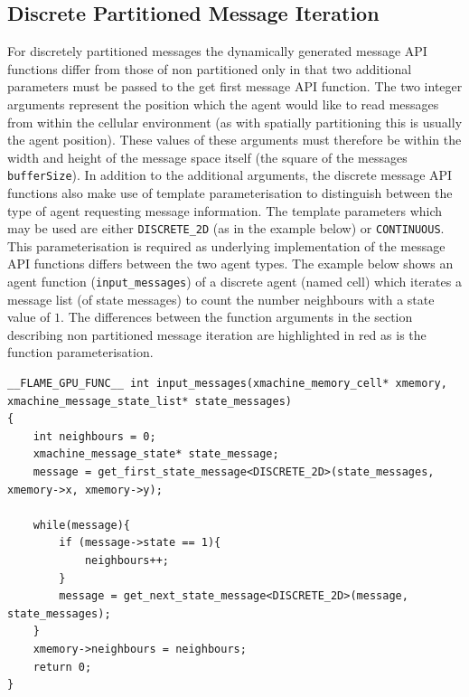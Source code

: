 \documentclass[11pt, a4paper, onecolumn, oneside]{report}
\begin{document}
\subsection{Discrete Partitioned Message Iteration}
\label{sec:353}


For discretely partitioned messages the dynamically generated message API functions differ from those of non partitioned only in that two additional parameters must be passed to the get first message API function.
The two integer arguments represent the position which the agent would like to read messages from within the cellular environment (as with spatially partitioning this is usually the agent position).
These values of these arguments must therefore be within the width and height of the message space itself (the square of the messages \texttt{bufferSize}).
In addition to the additional arguments, the discrete message API functions also make use of template parameterisation to distinguish between the type of agent requesting message information.
The template parameters which may be used are either \texttt{DISCRETE_2D} (as in the example below) or \texttt{CONTINUOUS}.
This parameterisation is required as underlying implementation of the message API functions differs between the two agent types.
The example below shows an agent function (\texttt{input_messages}) of a discrete agent (named cell) which iterates a message list (of state messages) to count the number neighbours with a state value of $1$.
The differences between the function arguments in the section describing non partitioned message iteration are highlighted in red as is the function parameterisation.

\begin{verbatim}
__FLAME_GPU_FUNC__ int input_messages(xmachine_memory_cell* xmemory, xmachine_message_state_list* state_messages)
{
    int neighbours = 0;
    xmachine_message_state* state_message;
    message = get_first_state_message<DISCRETE_2D>(state_messages, xmemory->x, xmemory->y);
    
    while(message){
        if (message->state == 1){
            neighbours++;
        }
        message = get_next_state_message<DISCRETE_2D>(message, state_messages);
    }
    xmemory->neighbours = neighbours;
    return 0;
}
\end{verbatim}

\end{document}
